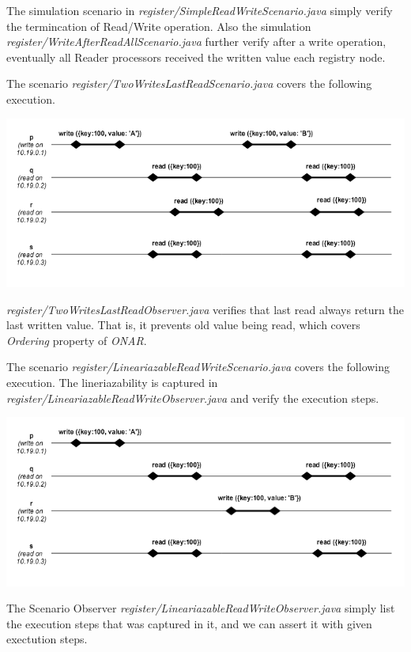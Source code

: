 \documentclass[a4paper, 11pt]{article}
\begin{document}
The simulation scenario in \textit{register/SimpleReadWriteScenario.java} simply verify the termincation of Read/Write operation. Also the simulation \textit{register/WriteAfterReadAllScenario.java} further verify after a write operation, eventually all Reader processors received the written value each registry node.

The scenario \textit{register/TwoWritesLastReadScenario.java} covers the following execution.

{\centering\includegraphics[scale = 0.5]{./images/2writers_read_last.png}\par}

\textit{register/TwoWritesLastReadObserver.java} verifies that last read always return the last written value. That is, it prevents old value being read, which covers \textit{Ordering} property of \textit{ONAR}.

The scenario \textit{register/LineariazableReadWriteScenario.java} covers the following execution. The lineriazability is captured in \textit{register/LineariazableReadWriteObserver.java} and verify the execution steps.

{\centering\includegraphics[scale = 0.5]{./images/mwriters_read.png}\par}

The Scenario Observer \textit{register/LineariazableReadWriteObserver.java} simply list the execution steps that was captured in it, and we can assert it with given exectution steps.
\end{document}
